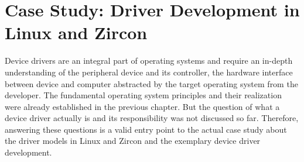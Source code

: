 
\chapter{Case Study: Driver Development in Linux and Zircon}\label{ch:case-study}
Device drivers are an integral part of operating systems and require an in-depth understanding of the peripheral device and its controller, the hardware interface between device and computer abstracted by the target operating system from the developer.
The fundamental operating system principles and their realization were already established in the previous chapter.
But the question of what a device driver actually is and its responsibility was not discussed so far.
Therefore, answering these questions is a valid entry point to the actual case study about the driver models in Linux and Zircon and the exemplary device driver development.

